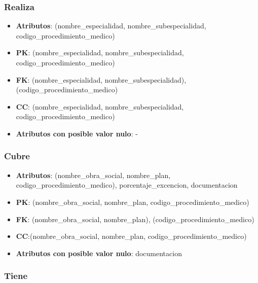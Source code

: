 \documentclass[a4paper,11pt]{article}
\begin{document}
\subsubsection{\textbf{Realiza}}

\begin{itemize}

\item 
\textbf{Atributos}: (nombre\_especialidad, nombre\_subespecialidad, codigo\_procedimiento\_medico)

\item 
\textbf{PK}: (nombre\_especialidad, nombre\_subespecialidad, codigo\_procedimiento\_medico)

\item
\textbf{FK}: (nombre\_especialidad, nombre\_subespecialidad), (codigo\_procedimiento\_medico)

\item 
\textbf{CC}: (nombre\_especialidad, nombre\_subespecialidad, codigo\_procedimiento\_medico)

\item 
\textbf{Atributos con posible valor nulo}: -

\end{itemize}
\subsubsection{\textbf{Cubre}}

\begin{itemize}

\item 
\textbf{Atributos}: (nombre\_obra\_social, nombre\_plan, codigo\_procedimiento\_medico),
porcentaje\_excencion, documentacion

\item 
\textbf{PK}: (nombre\_obra\_social, nombre\_plan, codigo\_procedimiento\_medico)

\item
\textbf{FK}: (nombre\_obra\_social, nombre\_plan), (codigo\_procedimiento\_medico)

\item 
\textbf{CC}:(nombre\_obra\_social, nombre\_plan, codigo\_procedimiento\_medico)

\item 
\textbf{Atributos con posible valor nulo}: documentacion

\end{itemize}
\subsubsection{\textbf{Tiene}}
\end{document}
